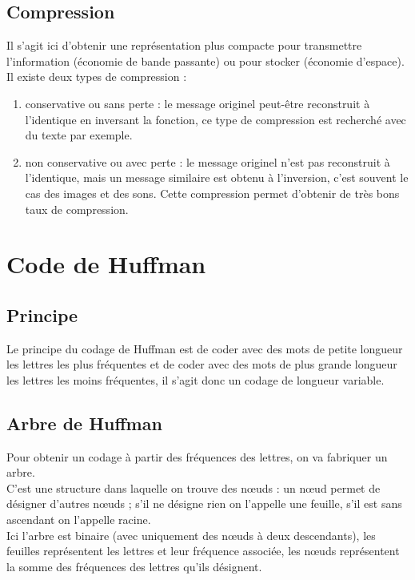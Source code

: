 \documentclass[a4paper,10pt]{book}
\begin{document}
\subsection{Compression}
Il s’agit ici d’obtenir une représentation plus compacte pour transmettre l'information (économie de bande passante) ou pour stocker (économie d’espace).\\

Il existe deux types de compression :\\ \begin{enumerate}
\item conservative ou sans perte : le message originel peut-être reconstruit à l’identique en inversant la fonction, ce type de compression est recherché avec du texte par exemple.
\item non conservative ou avec perte : le message originel n’est pas reconstruit à l’identique, mais un
message similaire est obtenu à l’inversion, c'est souvent le cas des images et des sons. Cette compression permet d’obtenir de très bons taux de compression. \end{enumerate}

\section{Code de Huffman} \label{Huffman}
\subsection{Principe}
Le principe du codage de Huffman est de coder avec des mots de petite longueur les lettres les plus fréquentes et de coder avec des mots de plus grande longueur les lettres les moins fréquentes, il s'agit donc un codage de longueur variable.\\

\subsection{Arbre de Huffman}
Pour obtenir un codage à partir des fréquences des lettres, on va fabriquer un arbre.\\
C’est une structure dans laquelle on trouve des nœuds : un nœud permet de désigner d’autres nœuds ; s'il ne désigne rien on l'appelle une feuille, s'il est sans ascendant on l'appelle racine.\\

Ici l'arbre est binaire (avec uniquement des nœuds à deux descendants), les feuilles représentent les lettres et leur fréquence associée, les nœuds représentent la somme des fréquences des lettres qu’ils désignent.\\
\end{document}
